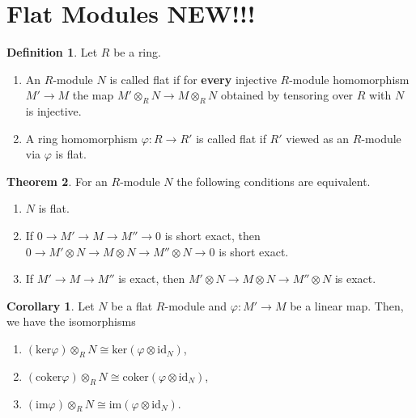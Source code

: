 \documentclass[a4paper]{book}
\theoremstyle{definition}
\newtheorem{definition}{Definition}[]
\newtheorem{theorem}[definition]{Theorem}
\newtheorem{corollary}{Corollary}
\begin{document}
\newpage
\section{Flat Modules NEW!!!}
\begin{defbox}
    \begin{definition}
        Let \(R\) be a ring.
        \begin{enumerate}
            \item An {\color{mathobj}\(R\)-module} \(N\) is called {\color{maththen}flat} if for \textbf{every} {\color{mathif}injective \(R\)-module homomorphism} \(M' \longrightarrow M\) the {\color{mathif}map} \(M' \otimes_R N \longrightarrow M \otimes_R N\) obtained by tensoring over \(R\) with \(N\) is {\color{mathif}injective}.
            \item A {\color{mathobj}ring homomorphism} \(\varphi: R \longrightarrow R'\) is called {\color{maththen}flat} if \(R'\) viewed as an \(R\)-module via \(\varphi\) is {\color{mathif}flat}.
        \end{enumerate}
    \end{definition}
\end{defbox}
\begin{thmbox}
    \begin{theorem}
        For an \(R\)-module \(N\) the following conditions are equivalent.
        \begin{enumerate}
            \item \(N\) is flat.
            \item If \(0 \rightarrow M' \rightarrow M \rightarrow M'' \rightarrow 0\) is short exact, then  \(0 \rightarrow M' \otimes N \rightarrow M \otimes N \rightarrow M'' \otimes N \rightarrow 0\) is short exact.
            \item If \(M' \rightarrow M \rightarrow M''\) is exact, then  \(M' \otimes N \rightarrow M \otimes N \rightarrow M'' \otimes N\) is exact.
        \end{enumerate}
    \end{theorem}
\end{thmbox}
\begin{thmbox}
    \begin{corollary}
        Let \(N\) be a flat \(R\)-module and \(\varphi: M' \rightarrow M\) be a linear map. Then, we have the isomorphisms
        \begin{enumerate}
            \item \((\text{ker} \varphi) \otimes_R N \cong \text{ker}(\varphi \otimes \text{id}_N)\),
            \item \((\text{coker} \varphi) \otimes_R N \cong \text{coker}(\varphi \otimes \text{id}_N)\),
            \item \((\text{im} \varphi) \otimes_R N \cong \text{im}(\varphi \otimes \text{id}_N)\).
        \end{enumerate}
    \end{corollary}
\end{thmbox}
\end{document}
